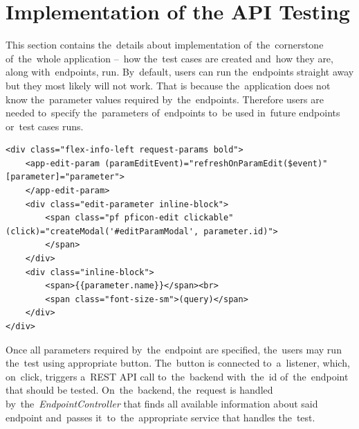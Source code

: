 \section{Implementation of the API Testing}
This section contains the~details about implementation of~the~cornerstone of~the~whole application 
--~how the~test cases are created and~how they are, along with~endpoints, run. By~default, users can run
the~endpoints straight away but they most likely will not work. That is because the~application does not know
the~parameter values required by~the~endpoints. Therefore users are needed to~specify the~parameters of~endpoints
to~be used in~future endpoints or~test cases runs. 

\vspace{1mm}
\begin{lstlisting}[caption=Frontend's implementation of~setting the~parameter's value in~which\, all logic is handled by~the~matching
TypeScript file., style=dp-html]
<div class="flex-info-left request-params bold">
	<app-edit-param (paramEditEvent)="refreshOnParamEdit($event)" [parameter]="parameter">
	</app-edit-param>
	<div class="edit-parameter inline-block">
		<span class="pf pficon-edit clickable" (click)="createModal('#editParamModal', parameter.id)">
		</span>
	</div>
	<div class="inline-block">
		<span>{{parameter.name}}</span><br>
		<span class="font-size-sm">(query)</span>
	</div>
</div>
\end{lstlisting}

Once all parameters required by~the~endpoint are specified, the~users may run the~test using appropriate button.
The~button is connected to~a~listener, which, on~click, triggers a~REST API call to~the~backend with~the~id of~the~endpoint
that should be tested. On~the~backend, the~request is handled by~the~\textit{EndpointController} that
finds all available information about said endpoint and~passes it~to~the~appropriate service that handles the~test.

